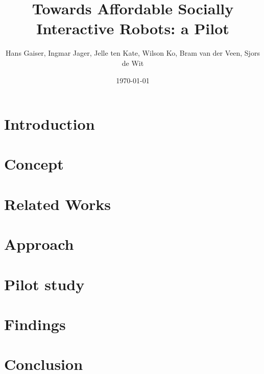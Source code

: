 \documentclass[a4paper,10pt,twocolumn]{article}
\begin{document}


\newcommand{\todo}[1]{\textbf{\textsc{\textcolor{red}{[#1]}}}}
\title{Towards Affordable Socially Interactive Robots: a Pilot}
\author{Hans Gaiser, Ingmar Jager, Jelle ten Kate, Wilson Ko, Bram van der Veen, Sjors de Wit}
\date{\today}

\maketitle



\section*{Introduction}
\label{problem}


\section*{Concept}
\label{concept}


\section*{Related Works}
\label{related}


\section*{Approach}
\label{approach}


\section*{Pilot study}
\label{simulation}


\section*{Findings}
\label{findings}


\section*{Conclusion}
\label{conclusion}


\printbibliography
\end{document}
